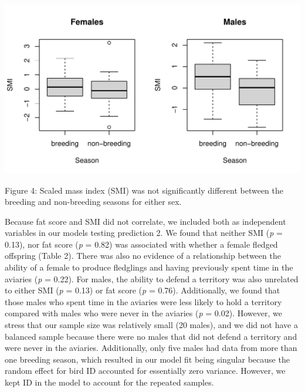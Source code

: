 \documentclass[
]{article}
\begin{document}
\includegraphics{gcondition_files/figure-latex/p2 condition and season-1.pdf}

Figure 4: Scaled mass index (SMI) was not significantly different
between the breeding and non-breeding seasons for either sex.

Because fat score and SMI did not correlate, we included both as
independent variables in our models testing prediction 2. We found that
neither SMI (\emph{p} = 0.13), nor fat score (\emph{p} = 0.82) was
associated with whether a female fledged offspring (Table 2). There was
also no evidence of a relationship between the ability of a female to
produce fledglings and having previously spent time in the aviaries
(\emph{p} = 0.22). For males, the ability to defend a territory was also
unrelated to either SMI (\emph{p} = 0.13) or fat score (\emph{p} =
0.76). Additionally, we found that those males who spent time in the
aviaries were less likely to hold a territory compared with males who
were never in the aviaries (\emph{p} = 0.02). However, we stress that
our sample size was relatively small (20 males), and we did not have a
balanced sample because there were no males that did not defend a
territory and were never in the aviaries. Additionally, only five males
had data from more than one breeding season, which resulted in our model
fit being singular because the random effect for bird ID accounted for
essentially zero variance. However, we kept ID in the model to account
for the repeated samples.
\end{document}
